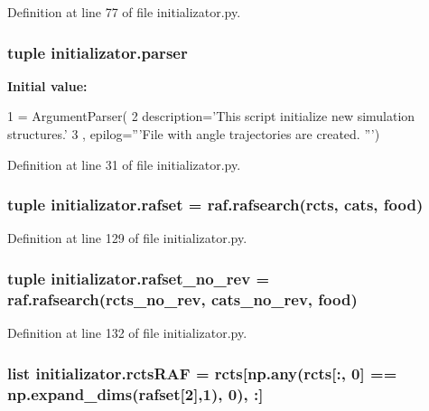 Definition at line 77 of file initializator.\-py.

\hypertarget{a00135_af2659789ba1896029e3ab9bfbf83d019}{
\subsubsection[{parser}]{\setlength{\rightskip}{0pt plus 5cm}tuple initializator.\-parser}}\label{a00135_af2659789ba1896029e3ab9bfbf83d019}
{\bfseries Initial value\-:}
\begin{DoxyCode}
1 = ArgumentParser(
2                                 description=\textcolor{stringliteral}{'This script initialize new simulation structures.'}
3                                 , epilog=\textcolor{stringliteral}{'''File with angle trajectories are created. '''})
\end{DoxyCode}


Definition at line 31 of file initializator.\-py.

\hypertarget{a00135_a1d1d6b79a11a2c646cdccd86ed33c06e}{
\subsubsection[{rafset}]{\setlength{\rightskip}{0pt plus 5cm}tuple initializator.\-rafset = raf.\-rafsearch(rcts, cats, {\bf food})}}\label{a00135_a1d1d6b79a11a2c646cdccd86ed33c06e}


Definition at line 129 of file initializator.\-py.

\hypertarget{a00135_a233edb9c8bdc6d737256db839206b8eb}{
\subsubsection[{rafset\-\_\-no\-\_\-rev}]{\setlength{\rightskip}{0pt plus 5cm}tuple initializator.\-rafset\-\_\-no\-\_\-rev = raf.\-rafsearch(rcts\-\_\-no\-\_\-rev, cats\-\_\-no\-\_\-rev, {\bf food})}}\label{a00135_a233edb9c8bdc6d737256db839206b8eb}


Definition at line 132 of file initializator.\-py.

\hypertarget{a00135_af3ff3d6a780c5a5522cef529ea028654}{
\subsubsection[{rcts\-R\-A\-F}]{\setlength{\rightskip}{0pt plus 5cm}list initializator.\-rcts\-R\-A\-F = rcts\mbox{[}np.\-any(rcts\mbox{[}\-:, 0\mbox{]} == np.\-expand\-\_\-dims({\bf rafset}\mbox{[}2\mbox{]},1), 0), \-:\mbox{]}}}\label{a00135_af3ff3d6a780c5a5522cef529ea028654}


